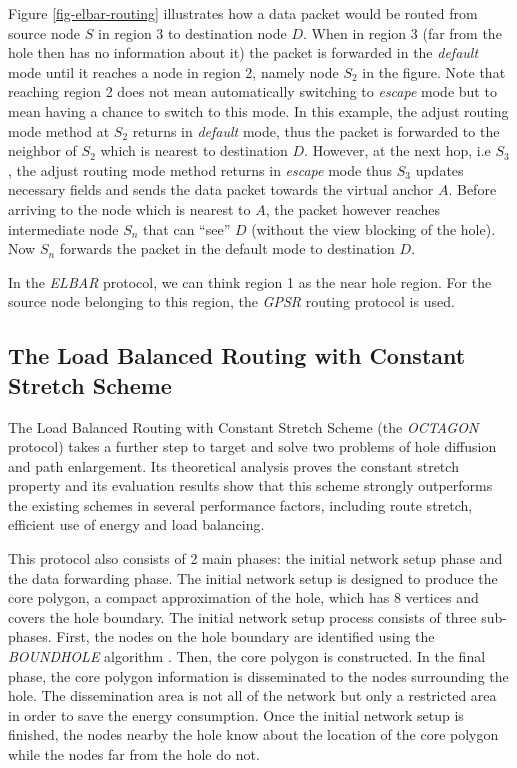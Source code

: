 Figure \ref{fig-elbar-routing} illustrates how a data packet would be routed from source node $S$ in region 3 to destination node $D$. When in region 3 (far from the hole then has no information about it) the packet is forwarded in the \emph{default} mode until it reaches a node in region 2, namely node $S_2$ in the figure. Note that reaching region 2 does not mean automatically switching to \emph{escape} mode but to mean having a chance to switch to this mode. In this example, the adjust routing mode method at $S_2$ returns in \emph{default} mode, thus the packet is forwarded to the neighbor of $S_2$ which is nearest to destination $D$. However, at the next hop, i.e $S_3$, the adjust routing mode method returns in \emph{escape} mode thus $S_3$ updates necessary fields and sends the data packet towards the virtual anchor $A$. Before arriving to the node which is nearest to $A$, the packet however reaches intermediate node $S_n$ that can “see” $D$ (without the view blocking of the hole). Now $S_n$ forwards the packet in the default mode to destination $D$.

In the \emph{ELBAR} protocol, we can think region 1 as the near hole region. For the source node belonging to this region, the \emph{GPSR} routing protocol is used.

\subsection{The Load Balanced Routing with Constant Stretch Scheme}
The Load Balanced Routing with Constant Stretch Scheme (the \emph{OCTAGON} protocol) takes a further step to target and solve two problems of hole diffusion and path enlargement. Its theoretical analysis proves the constant stretch property and its evaluation results show that this scheme strongly outperforms the existing schemes in several performance factors, including route stretch, efficient use of energy and load balancing.

This protocol also consists of 2 main phases: the initial network setup phase and the data forwarding phase. The initial network setup is designed to produce the core polygon, a compact approximation of the hole, which has 8 vertices and covers the hole boundary. The initial network setup process consists of three sub-phases. First, the nodes on the hole boundary are identified using the \emph{BOUNDHOLE} algorithm \cite{boundhole}. Then, the core polygon is constructed. In the final phase, the core polygon information is disseminated to the nodes surrounding the hole. The dissemination area is not all of the network but only a restricted area in order to save the energy consumption. Once the initial network setup is finished, the nodes nearby the hole know about the location of the core polygon while the nodes far from the hole do not.

